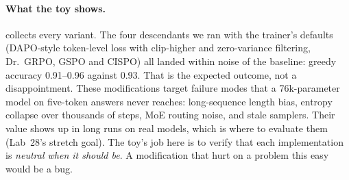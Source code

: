 \paragraph{What the toy shows.}  collects every variant. The four
descendants we ran with the trainer's defaults (DAPO-style token-level loss with clip-higher
and zero-variance filtering, Dr.~GRPO, GSPO and CISPO) all landed within noise of the
baseline: greedy accuracy 0.91--0.96 against 0.93. That is the expected outcome, not a
disappointment. These modifications target failure modes that a 76k-parameter model on
five-token answers never reaches: long-sequence length bias, entropy collapse over thousands
of steps, MoE routing noise, and stale samplers. Their value shows up in long runs on real
models, which is where to evaluate them (Lab~28's stretch goal). The toy's job here is to
verify that each implementation is \emph{neutral when it should be}. A modification that hurt
on a problem this easy would be a bug.

